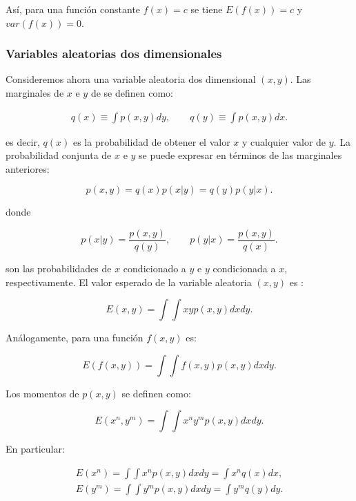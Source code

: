 \documentclass[../proyecto.tex]{memoir}
\begin{document}
Así, para una función constante $f(x)=c$ se tiene $E(f(x))=c$ y $var(f(x)) = 0$.

\subsubsection{Variables aleatorias dos dimensionales}

Consideremos ahora una variable aleatoria dos dimensional $(x,y)$. Las marginales de $x$ e $y$ de se definen como:

\begin{align*}
q(x) \equiv \int p(x,y) dy, \qquad q(y) \equiv \int p(x,y) dx .
\end{align*}

es decir, $q(x)$ es la probabilidad de obtener el valor $x$ y cualquier valor de $y$. La probabilidad conjunta de $x$ e $y$ se puede expresar en términos de las marginales anteriores:

\begin{equation*}
p(x,y) = q(x)p(x|y) = q(y)p(y|x).
\end{equation*}

donde 

\begin{equation*}
p(x|y) = \frac{p(x,y)}{q(y)}, \qquad p(y|x) = \frac{p(x,y)}{q(x)}.
\end{equation*}

son las probabilidades de $x$ condicionado a $y$ e $y$ condicionada a $x$, respectivamente. El valor esperado de la  variable aleatoria $(x,y)$ es :

\begin{equation*}
E(x,y)= \int\int xyp(x,y)dxdy.
\end{equation*}

Análogamente, para una función $f(x,y)$ es:

\begin{equation*}
E(f(x,y)) = \int\int f(x,y)p(x,y)dxdy.
\end{equation*}

Los momentos de $p(x,y)$ se definen como:

\begin{equation*}
E(x^{n},y^{m})= \int\int x^{n}y^{m}p(x,y)dxdy.
\end{equation*}

En particular:

\begin{align*}
E(x^{n})= \int\int x^{n}p(x,y)dxdy = \int x^{n}q(x)dx, 
\end{align*}
\begin{align*}
E(y^{m})= \int\int y^{m}p(x,y)dxdy = \int y^{m}q(y)dy.
\end{align*}
\end{document}
